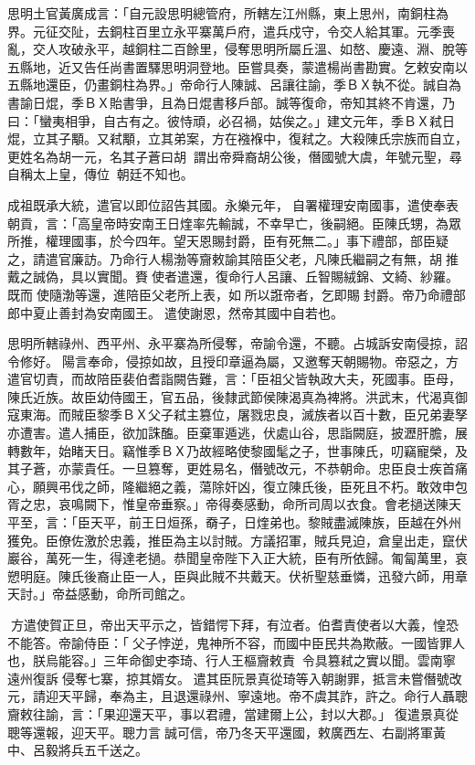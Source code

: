 \begin{pinyinscope}
思明土官黃廣成言：「自元設思明總管府，所轄左江州縣，東上思州，南銅柱為界。元征交阯，去銅柱百里立永平寨萬戶府，遣兵戍守，令交人給其軍。元季喪亂，交人攻破永平，越銅柱二百餘里，侵奪思明所屬丘溫、如嶅、慶遠、淵、脫等五縣地，近又告任尚書置驛思明洞登地。臣嘗具奏，蒙遣楊尚書勘實。乞敕安南以五縣地還臣，仍畫銅柱為界。」帝命行人陳誠、呂讓往諭，季ＢＸ執不從。誠自為書諭日焜，季ＢＸ貽書爭，且為日焜書移戶部。誠等復命，帝知其終不肯還，乃曰：「蠻夷相爭，自古有之。彼恃頑，必召禍，姑俟之。」建文元年，季ＢＸ弒日焜，立其子顒。又弒顒，立其弟案，方在襁褓中，復弒之。大殺陳氏宗族而自立，更姓名為胡一元，名其子蒼曰胡，謂出帝舜裔胡公後，僭國號大虞，年號元聖，尋自稱太上皇，傳位，朝廷不知也。

成祖既承大統，遣官以即位詔告其國。永樂元年，自署權理安南國事，遣使奉表朝貢，言：「高皇帝時安南王日煃率先輸誠，不幸早亡，後嗣絕。臣陳氏甥，為眾所推，權理國事，於今四年。望天恩賜封爵，臣有死無二。」事下禮部，部臣疑之，請遣官廉訪。乃命行人楊渤等齎敕諭其陪臣父老，凡陳氏繼嗣之有無，胡推戴之誠偽，具以實聞。賚使者遣還，復命行人呂讓、丘智賜絨錦、文綺、紗羅。既而使隨渤等還，進陪臣父老所上表，如所以誑帝者，乞即賜封爵。帝乃命禮部郎中夏止善封為安南國王。遣使謝恩，然帝其國中自若也。

思明所轄祿州、西平州、永平寨為所侵奪，帝諭令還，不聽。占城訴安南侵掠，詔令修好。陽言奉命，侵掠如故，且授印章逼為屬，又邀奪天朝賜物。帝惡之，方遣官切責，而故陪臣裴伯耆詣闕告難，言：「臣祖父皆執政大夫，死國事。臣母，陳氏近族。故臣幼侍國王，官五品，後隸武節侯陳渴真為裨將。洪武末，代渴真御寇東海。而賊臣黎季ＢＸ父子弒主篡位，屠戮忠良，滅族者以百十數，臣兄弟妻孥亦遭害。遣人捕臣，欲加誅醢。臣棄軍遁逃，伏處山谷，思詣闕庭，披瀝肝膽，展轉數年，始睹天日。竊惟季ＢＸ乃故經略使黎國髦之子，世事陳氏，叨竊寵榮，及其子蒼，亦蒙貴任。一旦篡奪，更姓易名，僭號改元，不恭朝命。忠臣良士疾首痛心，願興弔伐之師，隆繼絕之義，蕩除奸凶，復立陳氏後，臣死且不朽。敢效申包胥之忠，哀鳴闕下，惟皇帝垂察。」帝得奏感動，命所司周以衣食。會老撾送陳天平至，言：「臣天平，前王日烜孫，奣子，日煃弟也。黎賊盡滅陳族，臣越在外州獲免。臣僚佐激於忠義，推臣為主以討賊。方議招軍，賊兵見迫，倉皇出走，竄伏巖谷，萬死一生，得達老撾。恭聞皇帝陛下入正大統，臣有所依歸。匍匐萬里，哀愬明庭。陳氏後裔止臣一人，臣與此賊不共戴天。伏祈聖慈垂憐，迅發六師，用章天討。」帝益感動，命所司館之。

方遣使賀正旦，帝出天平示之，皆錯愕下拜，有泣者。伯耆責使者以大義，惶恐不能答。帝諭侍臣：「父子悖逆，鬼神所不容，而國中臣民共為欺蔽。一國皆罪人也，朕烏能容。」三年命御史李琦、行人王樞齎敕責，令具篡弒之實以聞。雲南寧遠州復訴侵奪七寨，掠其婿女。遣其臣阮景真從琦等入朝謝罪，抵言未嘗僭號改元，請迎天平歸，奉為主，且退還祿州、寧遠地。帝不虞其詐，許之。命行人聶聰齎敕往諭，言：「果迎還天平，事以君禮，當建爾上公，封以大郡。」復遣景真從聰等還報，迎天平。聰力言誠可信，帝乃冬天平還國，敕廣西左、右副將軍黃中、呂毅將兵五千送之。


\end{pinyinscope}
